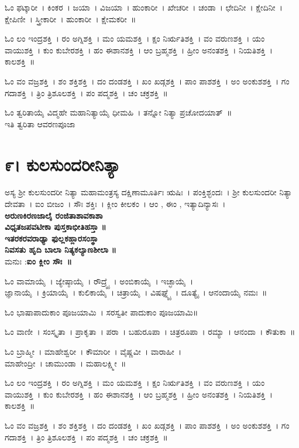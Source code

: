 ಓಂ ಫಟ್ಕಾರೀ~। ಕಿಂಕರ~। ಜಯಾ~। ವಿಜಯಾ~। ಹುಂಕಾರೀ~। ಖೇಚರೀ~। ಚಂಡಾ~। ಛೇದಿನೀ~। ಕ್ಷೇದಿನೀ~। ಕ್ಷೇಪಿಣೀ~। ಸ್ತ್ರೀಕಾರೀ~। ಹುಂಕಾರೀ~। ಕ್ಷೇಮಕರೀ~॥

ಓಂ ಲಂ ಇಂದ್ರಶಕ್ತಿ~।  ರಂ ಅಗ್ನಿಶಕ್ತಿ~।  ಮಂ ಯಮಶಕ್ತಿ~।  ಕ್ಷಂ ನಿರ್ಋತಿಶಕ್ತಿ~।  ವಂ ವರುಣಶಕ್ತಿ~।  ಯಂ ವಾಯುಶಕ್ತಿ~।  ಕುಂ ಕುಬೇರಶಕ್ತಿ~।  ಹಂ ಈಶಾನಶಕ್ತಿ~।  ಆಂ ಬ್ರಹ್ಮಶಕ್ತಿ~।  ಹ್ರೀಂ ಅನಂತಶಕ್ತಿ~।  ನಿಯತಿಶಕ್ತಿ~।  ಕಾಲಶಕ್ತಿ~॥ 

ಓಂ ವಂ ವಜ್ರಶಕ್ತಿ~।  ಶಂ ಶಕ್ತಿಶಕ್ತಿ~।  ದಂ ದಂಡಶಕ್ತಿ~।  ಖಂ ಖಡ್ಗಶಕ್ತಿ~।  ಪಾಂ ಪಾಶಶಕ್ತಿ~।  ಅಂ ಅಂಕುಶಶಕ್ತಿ~।  ಗಂ ಗದಾಶಕ್ತಿ~।  ತ್ರಿಂ ತ್ರಿಶೂಲಶಕ್ತಿ~।  ಪಂ ಪದ್ಮಶಕ್ತಿ~।  ಚಂ ಚಕ್ರಶಕ್ತಿ~॥ 

ಓಂ ತ್ವರಿತಾಯೈ ವಿದ್ಮಹೇ ಮಹಾನಿತ್ಯಾಯೈ ಧೀಮಹಿ~। ತನ್ನೋ ನಿತ್ಯಾ ಪ್ರಚೋದಯಾತ್~॥\\
ಇತಿ ತ್ವರಿತಾ ಆವರಣಪೂಜಾ
\section{೯। ಕುಲಸುಂದರೀನಿತ್ಯಾ}
ಅಸ್ಯ ಶ್ರೀ ಕುಲಸುಂದರೀ ನಿತ್ಯಾ ಮಹಾಮಂತ್ರಸ್ಯ ದಕ್ಷಿಣಾಮೂರ್ತಿಃ ಋಷಿಃ~। ಪಂಕ್ತಿಶ್ಛಂದಃ~। ಶ್ರೀ ಕುಲಸುಂದರೀ ನಿತ್ಯಾ ದೇವತಾ~। ಐಂ ಬೀಜಂ~। ಸೌಃ ಶಕ್ತಿಃ~। ಕ್ಲೀಂ ಕೀಲಕಂ~। ಆಂ , ಈಂ , ಇತ್ಯಾದಿನ್ಯಾಸಃ~।\\
{\bfseries ಅರುಣಕಿರಣಜಾಲೈ ರಂಜಿತಾಶಾವಕಾಶಾ\\
ವಿಧೃತಜಪವಟೀಕಾ ಪುಸ್ತಕಾಭೀತಿಹಸ್ತಾ ॥\\
ಇತರಕರವರಾಢ್ಯಾ ಫುಲ್ಲಕಹ್ಲಾರಸಂಸ್ಥಾ\\
ನಿವಸತು ಹೃದಿ ಬಾಲಾ ನಿತ್ಯಕಲ್ಯಾಣಶೀಲಾ ॥\\}
ಮನುಃ :{\bfseries  ಐಂ ಕ್ಲೀಂ ಸೌಃ~॥}

ಓಂ ವಾಮಾಯೈ~। ಜ್ಯೇಷ್ಠಾಯೈ~। ರೌದ್ರ್ಯೈ~। ಅಂಬಿಕಾಯೈ~। ಇಚ್ಛಾಯೈ~। \\ಜ್ಞಾನಾಯೈ~। ಕ್ರಿಯಾಯೈ~। ಕುಲಿಕಾಯೈ~। ಚಿತ್ರಾಯೈ~। ವಿಷಘ್ನ್ಯೈ~। ದೂತ್ಯೈ~। ಆನಂದಾಯೈ ನಮಃ~॥

ಓಂ ಭಾಷಾಪಾದುಕಾಂ ಪೂಜಯಾಮಿ~।  ಸರಸ್ವತೀ ಪಾದುಕಾಂ ಪೂಜಯಾಮಿ॥ 

ಓಂ ವಾಣೀ~।  ಸಂಸ್ಕೃತಾ~।  ಪ್ರಾಕೃತಾ~।  ಪರಾ~।  ಬಹುರೂಪಾ~।  ಚಿತ್ರರೂಪಾ~।  ರಮ್ಯಾ~।  ಆನಂದಾ~।  ಕೌತುಕಾ~॥ 

ಓಂ ಬ್ರಾಹ್ಮೀ~।  ಮಾಹೇಶ್ವರೀ~।  ಕೌಮಾರೀ~।  ವೈಷ್ಣವೀ~।  ವಾರಾಹೀ~। \\ ಮಾಹೇಂದ್ರೀ~।  ಚಾಮುಂಡಾ~।  ಮಹಾಲಕ್ಷ್ಮೀ~॥ 

ಓಂ ಲಂ ಇಂದ್ರಶಕ್ತಿ~।  ರಂ ಅಗ್ನಿಶಕ್ತಿ~।  ಮಂ ಯಮಶಕ್ತಿ~।  ಕ್ಷಂ ನಿರ್ಋತಿಶಕ್ತಿ~।  ವಂ ವರುಣಶಕ್ತಿ~।  ಯಂ ವಾಯುಶಕ್ತಿ~।  ಕುಂ ಕುಬೇರಶಕ್ತಿ~।  ಹಂ ಈಶಾನಶಕ್ತಿ~।  ಆಂ ಬ್ರಹ್ಮಶಕ್ತಿ~।  ಹ್ರೀಂ ಅನಂತಶಕ್ತಿ~।  ನಿಯತಿಶಕ್ತಿ~।  ಕಾಲಶಕ್ತಿ~॥ 

ಓಂ ವಂ ವಜ್ರಶಕ್ತಿ~।  ಶಂ ಶಕ್ತಿಶಕ್ತಿ~।  ದಂ ದಂಡಶಕ್ತಿ~।  ಖಂ ಖಡ್ಗಶಕ್ತಿ~।  ಪಾಂ ಪಾಶಶಕ್ತಿ~।  ಅಂ ಅಂಕುಶಶಕ್ತಿ~।  ಗಂ ಗದಾಶಕ್ತಿ~।  ತ್ರಿಂ ತ್ರಿಶೂಲಶಕ್ತಿ~।  ಪಂ ಪದ್ಮಶಕ್ತಿ~।  ಚಂ ಚಕ್ರಶಕ್ತಿ~॥ 


